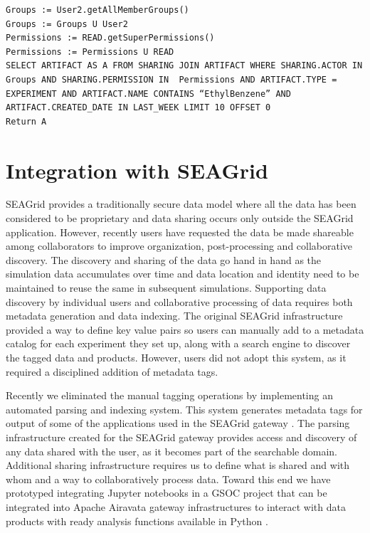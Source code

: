 \documentclass[sigconf]{acmart}
\begin{document}
\begin{lstlisting}
Groups := User2.getAllMemberGroups()
Groups := Groups U User2
Permissions := READ.getSuperPermissions()
Permissions := Permissions U READ
SELECT ARTIFACT AS A FROM SHARING JOIN ARTIFACT WHERE SHARING.ACTOR IN Groups AND SHARING.PERMISSION IN  Permissions AND ARTIFACT.TYPE = EXPERIMENT AND ARTIFACT.NAME CONTAINS “EthylBenzene” AND ARTIFACT.CREATED_DATE IN LAST_WEEK LIMIT 10 OFFSET 0
Return A
\end{lstlisting}

\section{Integration with SEAGrid}

SEAGrid provides a traditionally secure data model where all the data has been considered to be proprietary and data sharing occurs only outside the SEAGrid application. However, recently users have requested the data be made shareable among collaborators to improve organization, post-processing and collaborative discovery. The discovery and sharing of the data go hand in hand as the simulation data accumulates over time and data location and identity need to be maintained to reuse the same in subsequent simulations. Supporting data discovery by individual users and collaborative processing of data requires both metadata generation and data indexing. The original SEAGrid infrastructure provided a way to define key value pairs so users can manually add to a metadata catalog for each experiment they set up, along with a search engine to discover the tagged data and products. However, users did not adopt this system, as it required a disciplined addition of metadata tags.  

Recently we eliminated the manual tagging operations by implementing an automated parsing and indexing system. This system generates metadata tags for output of some of the applications used in the SEAGrid gateway \cite{nakandala2016anatomy}. The parsing infrastructure created for the SEAGrid gateway provides access and discovery of any data shared with the user, as it becomes part of the searchable domain. Additional sharing infrastructure requires us to define what is shared and with whom and a way to collaboratively process data. Toward this end we have prototyped integrating Jupyter notebooks in a GSOC project that can be integrated into Apache Airavata gateway infrastructures to interact with data products with ready analysis functions available in Python \cite{xsedeGateways}.   
\end{document}
